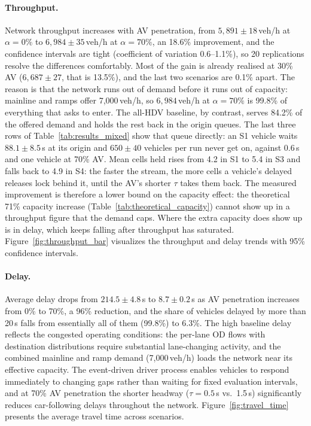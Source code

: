 \documentclass[review,authoryear]{elsarticle}
\begin{document}
\paragraph{Throughput.} Network throughput increases with AV penetration, from $5{,}891 \pm 18$\,veh/h at $\alpha = 0\%$ to $6{,}984 \pm 35$\,veh/h at $\alpha = 70\%$, an 18.6\% improvement, and the confidence intervals are tight (coefficient of variation 0.6--1.1\%), so 20 replications resolve the differences comfortably. Most of the gain is already realised at 30\% AV ($6{,}687 \pm 27$, that is 13.5\%), and the last two scenarios are 0.1\% apart. The reason is that the network runs out of demand before it runs out of capacity: mainline and ramps offer 7{,}000\,veh/h, so $6{,}984$\,veh/h at $\alpha = 70\%$ is 99.8\% of everything that asks to enter. The all-HDV baseline, by contrast, serves 84.2\% of the offered demand and holds the rest back in the origin queues. The last three rows of Table~\ref{tab:results_mixed} show that queue directly: an S1 vehicle waits $88.1 \pm 8.5$\,s at its origin and $650 \pm 40$ vehicles per run never get on, against $0.6$\,s and one vehicle at 70\% AV. Mean cells held rises from 4.2 in S1 to 5.4 in S3 and falls back to 4.9 in S4: the faster the stream, the more cells a vehicle's delayed releases lock behind it, until the AV's shorter $\tau$ takes them back. The measured improvement is therefore a lower bound on the capacity effect: the theoretical 71\% capacity increase (Table~\ref{tab:theoretical_capacity}) cannot show up in a throughput figure that the demand caps. Where the extra capacity does show up is in delay, which keeps falling after throughput has saturated. Figure~\ref{fig:throughput_bar} visualizes the throughput and delay trends with 95\% confidence intervals.

\paragraph{Delay.} Average delay drops from $214.5 \pm 4.8$\,s to $8.7 \pm 0.2$\,s as AV penetration increases from 0\% to 70\%, a 96\% reduction, and the share of vehicles delayed by more than 20\,s falls from essentially all of them (99.8\%) to 6.3\%. The high baseline delay reflects the congested operating conditions: the per-lane OD flows with destination distributions require substantial lane-changing activity, and the combined mainline and ramp demand (7{,}000\,veh/h) loads the network near its effective capacity. The event-driven driver process enables vehicles to respond immediately to changing gaps rather than waiting for fixed evaluation intervals, and at 70\% AV penetration the shorter headway ($\tau = 0.5$\,s vs.\ 1.5\,s) significantly reduces car-following delays throughout the network. Figure~\ref{fig:travel_time} presents the average travel time across scenarios.
\end{document}

